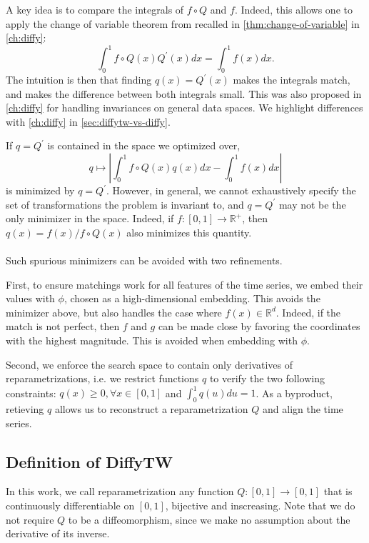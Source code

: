 A key idea is to compare the integrals of $f\circ Q$ and $f$. Indeed, this allows one to apply the change of variable theorem from \cite{aliprantis1998principles} recalled in \cref{thm:change-of-variable} in \cref{ch:diffy}:
\begin{equation}
    \int_0^1 f\circ Q(x)Q^\prime(x)dx = \int_0^1 f(x)dx.
\end{equation}
The intuition is then that finding $q(x) = Q^\prime(x)$ makes the integrals match, and makes the difference between both integrals small. This was also proposed in \cref{ch:diffy} for handling invariances on general data spaces. We highlight differences with \cref{ch:diffy} in \cref{sec:diffytw-vs-diffy}.

If $q = Q^\prime$ is contained in the space we optimized over,
\begin{equation}
    q \mapsto \left\vert\int_0^1 f\circ Q(x)q(x) dx - \int_0^1 f(x)dx\right\vert
\end{equation}
is minimized by $q=Q^\prime$. However, in general, we cannot exhaustively specify the set of transformations the problem is invariant to, and $q=Q^\prime$ may not be the only minimizer in the space. Indeed, if $f:[0,1] \to \mathbb R^+$, then $q(x) = f(x) / f\circ Q(x)$ also minimizes this quantity.

\paragraph{}
Such spurious minimizers can be avoided with two refinements.

First, to ensure matchings work for all features of the time series, we embed their values with $\phi$, chosen as a high-dimensional embedding. This avoids the minimizer above, but also handles the case where $f(x)\in\mathbb R^d$. Indeed, if the match is not perfect, then $f$ and $g$ can be made close by favoring the coordinates with the highest magnitude. This is avoided when embedding with $\phi$.

Second, we enforce the search space to contain only derivatives of reparametrizations, i.e. we restrict functions $q$ to verify the two following constraints: $q(x) \geq 0, \forall x\in[0,1]$ and $\int_0^1 q(u)du=1$. As a byproduct, retieving $q$ allows us to reconstruct a reparametrization $Q$ and align the time series.

\subsection{Definition of DiffyTW}
In this work, we call reparametrization any function $Q: [0,1] \to [0,1]$ that is continuously differentiable on $[0,1]$, bijective and inscreasing. Note that we do not require $Q$ to be a diffeomorphism, since we make no assumption about the derivative of its inverse.

